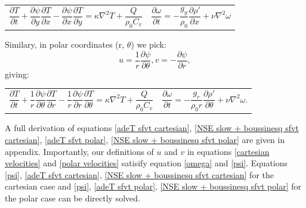 \documentclass{article}
\begin{document}
\begin{tabularx}{\textwidth}{XX}
\begin{equation}
	\frac{\partial T}{\partial t} + \frac{\partial \psi}{\partial y} \frac{\partial T}{\partial x} - \frac{\partial \psi}{\partial x} \frac{\partial T}{\partial y} = \kappa \nabla^2 T + \frac{Q}{\rho_0 C_v}
	\label{adeT sfvt cartesian}
\end{equation}
    &
\begin{equation}
	\frac{\partial \omega}{\partial t} = -\frac{g_y}{\rho_0} \frac{\partial \rho'}{\partial x} + \nu \nabla^2 \omega
	\label{NSE slow + boussinesq sfvt cartesian}
\end{equation}
\end{tabularx}\par


Similary, in polar coordinates (r, $\theta$) we pick:
\begin{equation}
	u = \frac{1}{r} \frac{\partial \psi}{\partial \theta}, v = -\frac{\partial \psi}{\partial r},
	\label{polar velocities}
\end{equation}
giving:

\begin{tabularx}{\textwidth}{XX}
\begin{equation}
	\frac{\partial T}{\partial t} + \frac{1}{r} \frac{\partial \psi}{\partial \theta} \frac{\partial T}{\partial r} - \frac{1}{r} \frac{\partial \psi}{\partial r} \frac{\partial T}{\partial \theta} = \kappa \nabla^2 T + \frac{Q}{\rho_0 C_v}
	\label{adeT sfvt polar}
\end{equation}
    &
\begin{equation}
	\frac{\partial \omega}{\partial t} = - \frac{g_r}{\rho_0 r} \frac{\partial \rho'}{\partial \theta} +\nu \nabla^2 \omega.
	\label{NSE slow + boussinesq sfvt polar}
\end{equation}
\end{tabularx}\par

A full derivation of equations \ref{adeT sfvt cartesian}, \ref{NSE slow + boussinesq sfvt cartesian}, \ref{adeT sfvt polar}, \ref{NSE slow + boussinesq sfvt polar} are given in appendix.
Importantly, our definitions of $u$ and $v$ in equations \ref{cartesian velocities} and \ref{polar velocities} satisify equation \ref{omega} and \ref{psi}. Equations \ref{psi}, \ref{adeT sfvt cartesian}, \ref{NSE slow + boussinesq sfvt cartesian} for the cartesian case and \ref{psi}, \ref{adeT sfvt polar}, \ref{NSE slow + boussinesq sfvt polar} for the polar case can be directly solved.
\end{document}
